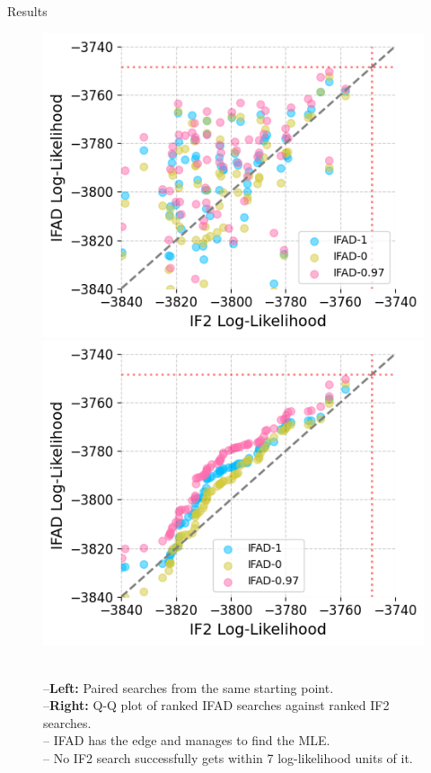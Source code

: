 \documentclass{beamer}
\begin{document}
\begin{frame}{Results}
    
\begin{figure}[htbp!]
    \centering
    \includegraphics[scale=0.37]{imgs/095/pairs.png}
    \includegraphics[scale=0.37]{imgs/095/qq.png}
    \caption{\\
    --\textbf{Left:} Paired searches from the same starting point. \\
    --\textbf{Right:} Q-Q plot of ranked IFAD searches against ranked IF2 searches. \\
    -- IFAD has the edge and manages to find the MLE.\\
    -- No IF2 search successfully gets within 7 log-likelihood units of it.}
    \label{fig:scatter}
\end{figure}
\end{frame}
\end{document}
